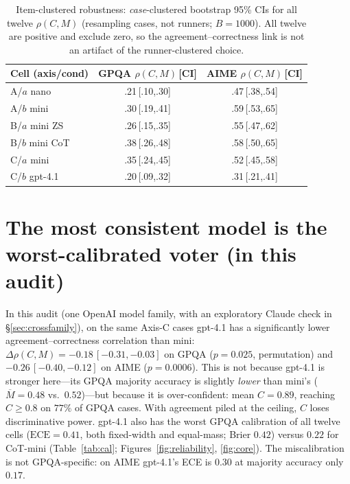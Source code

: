 \documentclass[11pt]{article}
\newcommand{\C}{\textit{C}}
\newcommand{\Mlab}{\textit{M}}
\begin{document}
\begin{table}[t]
\centering\footnotesize
\setlength{\tabcolsep}{4pt}
\begin{tabular}{@{}lcc@{}}
\toprule
Cell (axis/cond) & GPQA $\rho(\C,\Mlab)$\,[CI] & AIME $\rho(\C,\Mlab)$\,[CI] \\
\midrule
A/$a$ nano     & .21\,[.10,.30] & .47\,[.38,.54] \\
A/$b$ mini     & .30\,[.19,.41] & .59\,[.53,.65] \\
B/$a$ mini ZS  & .26\,[.15,.35] & .55\,[.47,.62] \\
B/$b$ mini CoT & .38\,[.26,.48] & .58\,[.50,.65] \\
C/$a$ mini     & .35\,[.24,.45] & .52\,[.45,.58] \\
C/$b$ gpt-4.1  & .20\,[.09,.32] & .31\,[.21,.41] \\
\bottomrule
\end{tabular}
\caption{Item-clustered robustness: \emph{case}-clustered bootstrap 95\% CIs for all twelve
$\rho(\C,\Mlab)$ (resampling cases, not runners; $B{=}1000$). All twelve are positive and exclude zero,
so the agreement--correctness link is not an artifact of the runner-clustered choice.}
\label{tab:caseclust}
\end{table}

\section{The most consistent model is the worst-calibrated voter (in this audit)}
\label{sec:frontier}
In this audit (one OpenAI model family, with an exploratory Claude check in \S\ref{sec:crossfamily}), on
the same Axis-C cases gpt-4.1 has a significantly lower agreement--correctness correlation than
mini: $\Delta\rho(\C,\Mlab)=-0.18\,[-0.31,-0.03]$ on GPQA ($p{=}0.025$, permutation) and
$-0.26\,[-0.40,-0.12]$ on AIME ($p{=}0.0006$). This is not because gpt-4.1 is stronger here---its GPQA
majority accuracy is slightly \emph{lower} than mini's ($\overline{\Mlab}{=}0.48$ vs.\ $0.52$)---but
because it is over-confident: mean $\C{=}0.89$, reaching $\C\geq0.8$ on $77\%$ of GPQA cases. With
agreement piled at the ceiling, $\C$ loses discriminative power. gpt-4.1 also has the worst GPQA
calibration of all twelve cells ($\mathrm{ECE}=0.41$, both fixed-width and equal-mass;
Brier $0.42$) versus $0.22$ for CoT-mini (Table~\ref{tab:cal}; Figures~\ref{fig:reliability},
\ref{fig:core}). The miscalibration is not GPQA-specific: on AIME gpt-4.1's ECE is $0.30$ at majority accuracy only $0.17$.
\end{document}
